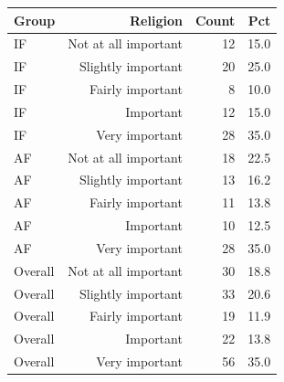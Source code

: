 \begin{tabular}{lrrr}
  \toprule
  Group & Religion & Count & Pct \\ 
  \midrule
  IF & Not at all important & 12 & 15.0 \\ 
  IF & Slightly important & 20 & 25.0 \\ 
  IF & Fairly important & 8 & 10.0 \\ 
  IF & Important & 12 & 15.0 \\ 
  IF & Very important & 28 & 35.0 \\ 
  AF & Not at all important & 18 & 22.5 \\ 
  AF & Slightly important & 13 & 16.2 \\ 
  AF & Fairly important & 11 & 13.8 \\ 
  AF & Important & 10 & 12.5 \\ 
  AF & Very important & 28 & 35.0 \\ 
  Overall & Not at all important & 30 & 18.8 \\ 
  Overall & Slightly important & 33 & 20.6 \\ 
  Overall & Fairly important & 19 & 11.9 \\ 
  Overall & Important & 22 & 13.8 \\ 
  Overall & Very important & 56 & 35.0 \\ 
  \bottomrule
\end{tabular}
